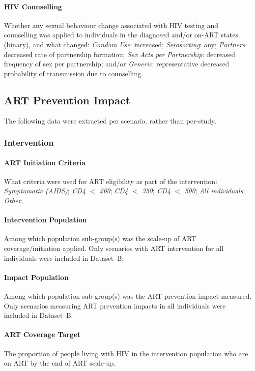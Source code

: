 \paragraph{HIV Counselling}
Whether any sexual behaviour change associated with HIV testing and counselling
was applied to individuals in the diagnosed and/or on-ART states (binary),
and what changed:
\emph{Condom Use}: increased;
\emph{Serosorting}: any;
\emph{Partners}: decreased rate of partnership formation;
\emph{Sex Acts per Partnership}: decreased frequency of sex per partnership; and/or
\emph{Generic}: representative decreased probability of transmission due to counselling.
\subsection{ART Prevention Impact}
\label{aa:defs:api}
The following data were extracted per scenario, rather than per-study.
\subsubsection{Intervention}
\label{aa:defs:interv}
\paragraph{ART Initiation Criteria}
What criteria were used for ART eligibility as part of the intervention:
\emph{Symptomatic (AIDS)};
\emph{CD4 $<$ 200};
\emph{CD4 $<$ 350};
\emph{CD4 $<$ 500};
\emph{All individuals};
\emph{Other}.
\paragraph{Intervention Population}
Among which population sub-group(s) was the scale-up of ART coverage/initiation applied.
Only scenarios with ART intervention for all individuals were included in Dataset~B.
\paragraph{Impact Population}
Among which population sub-group(s) was the ART prevention impact measured.
Only scenarios measuring ART prevention impacts in all individuals were included in Dataset~B.
\paragraph{ART Coverage Target}
The proportion of people living with HIV in the intervention population who are on ART
by the end of ART scale-up.
